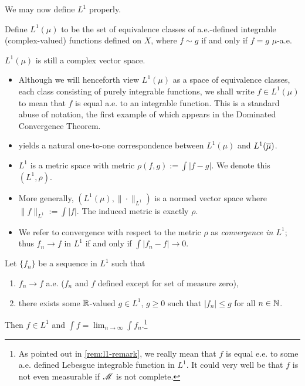 \documentclass[12pt]{article} %
\begin{document}
We may now define $L^1$ properly.

\begin{definition}
    Define $L^1(\mu)$ to be the set of equivalence classes of a.e.-defined integrable (complex-valued) functions defined on $X$, where $f \sim g$ if and only if $f = g$ $\mu$-a.e.
\end{definition}

\begin{remark}\label{rem:l1-remark}
    $L^1(\mu)$ is still a complex vector space.  \begin{itemize}
        \item Although we will henceforth view $L^1(\mu)$ as a space of equivalence classes, each class consisting of purely integrable functions, we shall write $f \in L^1(\mu)$ to mean that $f$ is equal a.e. to an integrable function. This is a standard abuse of notation, the first example of which appears in the Dominated Convergence Theorem.
        \item {} yields a natural one-to-one correspondence between $L^1(\mu)$ and $L^1(\overline{\mu})$. 
        \item $L^1$ is a metric space with metric $\rho(f, g) := \int |f-g|$. We denote this $(L^1, \rho)$.
        \item More generally, $(L^1(\mu), \|\cdot\|_{L^1})$ is a normed vector space where $\|f\|_{L^1} := \int |f|$. The induced metric is exactly $\rho$.
        \item We refer to convergence with respect to the metric $\rho$ as \textit{convergence in $L^1$}; thus $f_n \to f$ in $L^1$ if and only if $\int |f_n - f| \to 0$.
    \end{itemize}
\end{remark}

\begin{theorem}
    Let $\{f_n\}$ be a sequence in $L^1$ such that \begin{enumerate}
        \item $f_n \to f$ a.e. ($f_n$ and $f$ defined except for set of measure zero),
        \item there exists some $\mathbb{R}$-valued $g \in L^1$, $g \geq 0$ such that $|f_n| \leq g$ for all $n \in \mathbb{N}$.
    \end{enumerate}
    Then $f \in L^1$ and $\int f = \lim_{n\to \infty} \int f_n$.\footnote{As pointed out in \cref{rem:l1-remark}, we really mean that $f$ is equal e.e. to some a.e. defined Lebesgue integrable function in $L^1$. It could very well be that $f$ is not even measurable if $\mathscr{M}$ is not complete.}
\end{theorem}
\end{document}
